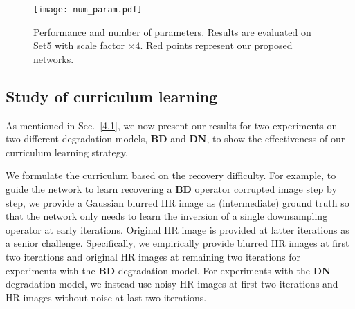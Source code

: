 \documentclass[10pt,twocolumn,letterpaper]{article}
\begin{document}
	\begin{table}[!htbp]
		\begin{center}
			\smallskip
			\caption{The investigation of curriculum learning (CL) on \textbf{BD} and \textbf{DN} degradation models with scale factor $\times4$. The average PSNR values are evaluated on Set5.}
			\label{CL_table}
		\end{center}
		\vspace{-1cm}	
	\end{table}	

	\begin{figure}[!htbp]
		\centering
		\texttt{[image: num\_param.pdf]}
		\caption{Performance and number of parameters. Results are evaluated on Set5 with scale factor $\times4$. Red points represent our proposed networks.}\label{num_param}\vspace{-0.45cm}
	\end{figure}
	\subsection{Study of curriculum learning}
	\label{4.4}
	As mentioned in Sec.~\ref{4.1}, we now present our results for two experiments on two different degradation models, \ie \textbf{BD} and \textbf{DN}, to show the effectiveness of our curriculum learning strategy.
	
	We formulate the curriculum based on the recovery difficulty. For example, to guide the network to learn recovering a \textbf{BD} operator corrupted image step by step, we provide a Gaussian blurred HR image as (intermediate) ground truth so that the network only needs to learn the inversion of a single downsampling operator at early iterations. Original HR image is provided at latter iterations as a senior challenge. Specifically, we empirically provide blurred HR images at first two iterations and original HR images at remaining two iterations for experiments with the \textbf{BD} degradation model. For experiments with the \textbf{DN} degradation model, we instead use noisy HR images at first two iterations and HR images without noise at last two iterations. 
\end{document}
